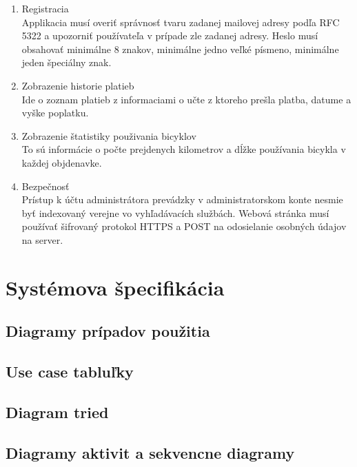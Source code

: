 \documentclass[12pt]{report}
\begin{document}
\begin{enumerate}
    \item Registracia \\
	      Applikacia musí overiť správnosť tvaru zadanej mailovej adresy podľa RFC 5322 
        a upozorniť používateľa v prípade zle zadanej adresy. Heslo musí obsahovať minimálne 8 
        znakov, minimálne jedno veľké písmeno, minimálne jeden špeciálny znak.

    \item Zobrazenie historie platieb\\
        Ide o zoznam platieb z informaciami o učte z ktoreho prešla platba, datume a vyške poplatku.
    \item Zobrazenie štatistiky použivania bicyklov\\
        To sú informácie o počte prejdenych kilometrov a dĺžke používania bicykla v každej objdenavke.
    \item Bezpečnosť\\
        Prístup k účtu administrátora prevádzky v administratorskom konte nesmie byť indexovaný verejne vo
        vyhľadávacích službách. Webová stránka musí používať šifrovaný protokol HTTPS a POST na odosielanie osobných 
        údajov na server.
\end{enumerate}

\chapter{Systémova špecifikácia}
\section{Diagramy prípadov použitia}

\clearpage 

\section{Use case tabluľky}

\clearpage 


\clearpage 


\clearpage 

\section{Diagram tried}

\clearpage 

\section{Diagramy aktivit a sekvencne diagramy}

\clearpage 
\end{document}
